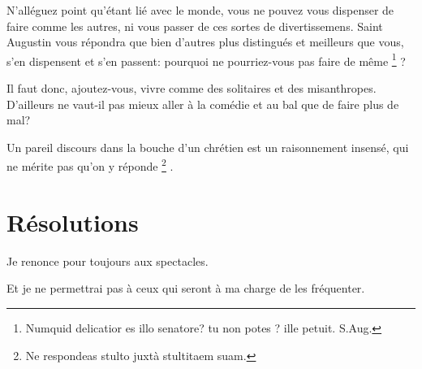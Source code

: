 \documentclass[instructions.tex]{subfiles}
\begin{document}
N’alléguez point qu’étant lié avec le monde, vous ne pouvez vous dispenser de faire comme les autres, ni vous passer de ces sortes de divertissemens. Saint Augustin vous répondra que bien d’autres plus distingués et meilleurs que vous, s’en dispensent et s’en passent: pourquoi ne pourriez-vous pas faire de même \footnote{Numquid delicatior es illo senatore? tu non potes ? ille petuit. S.Aug.} ?
 
Il faut donc, ajoutez-vous, vivre comme des solitaires et des misanthropes. D’ailleurs ne vaut-il pas mieux aller à la comédie et au bal que de faire plus de mal?
 
Un pareil discours dans la bouche d’un chrétien est un raisonnement insensé, qui ne mérite pas qu’on y réponde \footnote{Ne respondeas stulto juxtà stultitaem suam.} .
 
\section{Résolutions}
 
\primo Je renonce pour toujours aux spectacles.

\secundo Et je ne permettrai pas à ceux qui seront à ma charge de les fréquenter.
 
 
\end{document}
